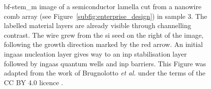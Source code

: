 \begin{figure}
    \centering
    \caption[\acs{bf}-\acs{stem_m} image of a semiconductor lamella cut from a nanowire in sample 3.]{\acs{bf}-\acs{stem_m} image of a semiconductor lamella cut from a nanowire  comb array (see Figure~\ref{subfig:enterprise_design}) in sample 3. The labelled material layers are already visible through channelling contrast. The wire grew from the \acs{si} seed on the right of the image, following the growth direction marked by the red arrow. An initial \acs{ingaas} nucleation layer gives way to an \acs{inp} stabilisation layer followed by \acs{ingaas} quantum wells and \acs{inp} barriers. This Figure was adapted from the work of Brugnolotto \textit{et al.} \cite{Brugnolotto2023} under the terms of the CC BY 4.0 licence \cite{CCBY40}.}
    \label{fig:s3_ov}
\end{figure}


